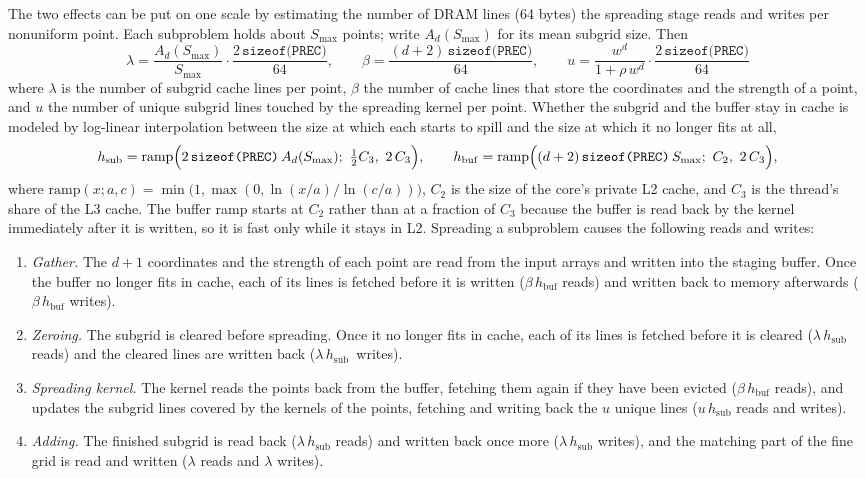 The two effects can be put on one scale by estimating the number of DRAM lines (64 bytes) the spreading stage reads and writes per nonuniform point. Each subproblem holds about $S_{\max}$ points; write $A_d(S_{\max})$ for its mean subgrid size. Then
\begin{equation}
    \lambda = \frac{A_d(S_{\max})}{S_{\max}} \cdot \frac{2\,\texttt{sizeof(PREC)}}{64}, \qquad
    \beta = \frac{(d+2)\,\texttt{sizeof(PREC)}}{64}, \qquad
      u = \frac{w^d}{1+\rho\,w^d} \cdot \frac{2\,\texttt{sizeof(PREC)}}{64}
    \label{eq:traffic_terms}
\end{equation}
where $\lambda$ is the number of subgrid cache lines per point, $\beta$ the number of cache lines that store the coordinates and the strength of a point, and $u$ the number of unique subgrid lines touched by the spreading kernel per point. Whether the subgrid and the buffer stay in cache is modeled by log-linear interpolation between the size at which each starts to spill and the size at which it no longer fits at all,
\begin{equation}
    h_{\mathrm{sub}} = \mathrm{ramp}\Bigl(2\,\texttt{sizeof(PREC)}\, A_d(S_{\max});\ \tfrac{1}{2} C_3,\ 2\, C_3\Bigr), \qquad
    h_{\mathrm{buf}} = \mathrm{ramp}\Bigl((d + 2)\,\texttt{sizeof(PREC)}\, S_{\max};\ C_2,\ 2\, C_3\Bigr),
    \label{eq:traffic_ramps}
\end{equation}
where $\mathrm{ramp}(x; a, c) = \min\bigl(1, \max(0, \ln(x/a) / \ln(c/a))\bigr)$, $C_2$ is the size of the core's private L2 cache, and $C_3$ is the thread's share of the L3 cache. The buffer ramp starts at $C_2$ rather than at a fraction of $C_3$ because the buffer is read back by the kernel immediately after it is written, so it is fast only while it stays in L2.
Spreading a subproblem causes the following reads and writes:
\begin{enumerate}
    \item \emph{Gather.} The $d + 1$ coordinates and the strength of each point are read from the input arrays and written into the staging buffer. Once the buffer no longer fits in cache, each of its lines is fetched before it is written ($\beta\, h_{\mathrm{buf}}$ reads) and written back to memory afterwards ($\beta\, h_{\mathrm{buf}}$ writes).
    \item \emph{Zeroing.} The subgrid is cleared before spreading. Once it no longer fits in cache, each of its lines is fetched before it is cleared ($\lambda\, h_{\mathrm{sub}}$ reads) and the cleared lines are written back ($\lambda\, h_{\mathrm{sub}}$~writes).
    \item \emph{Spreading kernel.} The kernel reads the points back from the buffer, fetching them again if they have been evicted ($\beta\, h_{\mathrm{buf}}$ reads), and updates the subgrid lines covered by the kernels of the points, fetching and writing back the $u$ unique lines ($u\, h_{\mathrm{sub}}$ reads and writes).
    \item \emph{Adding.} The finished subgrid is read back ($\lambda\, h_{\mathrm{sub}}$ reads) and written back once more ($\lambda\, h_{\mathrm{sub}}$ writes), and the matching part of the fine grid is read and written ($\lambda$ reads and $\lambda$ writes).
\end{enumerate}

